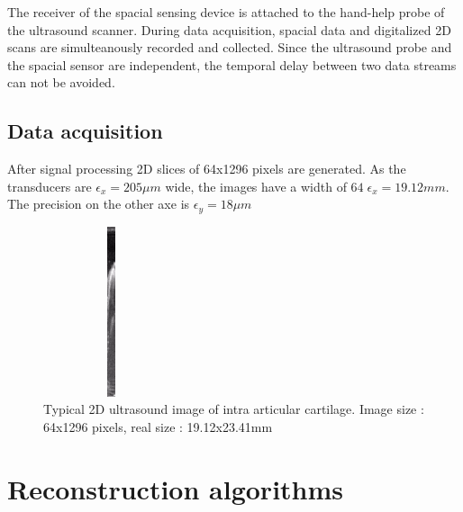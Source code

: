 \documentclass[12pt,journal,compsoc]{IEEEtran}
\begin{document}
The receiver of the spacial sensing device is attached to the hand-help probe of the ultrasound scanner.
During data acquisition, spacial data and digitalized 2D scans are simulteanously recorded and collected.
Since the ultrasound probe and the spacial sensor are independent, the temporal delay between two data streams can not be avoided.

\subsection{Data acquisition}

After signal processing 2D slices of 64x1296 pixels are generated. As the transducers are $\epsilon_x=205\mu m$ wide, the images have a width of $64\;\epsilon_x=19.12mm$. The precision on the other axe is $\epsilon_y=18\mu m$ 

\begin{figure}[!h]
\centering
\includegraphics[width=40mm, height=50mm]{scan}
\caption{Typical 2D ultrasound image of intra articular cartilage. Image size : 64x1296 pixels, real size : 19.12x23.41mm}
\label{fig_2}
\end{figure}


\section{Reconstruction algorithms}




\end{document}
